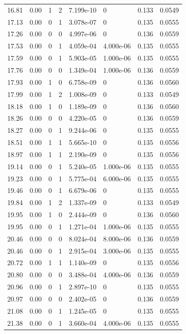 \documentclass[preview]{standalone}
\begin{document}
{{{\begin{tabular}{L{1.2cm}C{1.2cm} C{0.3cm}C{0.5cm} C{1.4cm}C{1.4cm} C{1.4cm}C{1.4cm}}
  16.81  &  0.00  & 1     &  2 &  7.199e-10  & 0  & 0.133 &  0.0549   \\ 
  17.13  &  0.00  & 0     &  1 &  3.078e-07  & 0  & 0.135 &  0.0555   \\ 
  17.26  &  0.00  & 0     &  0 &  4.997e-06  & 0  & 0.136 &  0.0559   \\ 
  17.53  &  0.00  & 0     &  1 &  4.059e-04  & 4.000e-06  & 0.135 &  0.0555   \\ 
  17.59  &  0.00  & 0     &  1 &  5.903e-05  & 1.000e-06  & 0.135 &  0.0555   \\ 
  17.76  &  0.00  & 0     &  0 &  1.349e-04  & 1.000e-06  & 0.136 &  0.0559   \\ 
  17.93  &  0.00  & 1     &  0 &  6.758e-09  & 0  & 0.136 &  0.0560   \\ 
  17.99  &  0.00  & 1     &  2 &  1.008e-09  & 0  & 0.133 &  0.0549   \\ 
  18.18  &  0.00  & 1     &  0 &  1.189e-09  & 0  & 0.136 &  0.0560   \\ 
  18.26  &  0.00  & 0     &  0 &  4.220e-05  & 0  & 0.136 &  0.0559   \\ 
  18.27  &  0.00  & 0     &  1 &  9.244e-06  & 0  & 0.135 &  0.0555   \\ 
  18.51  &  0.00  & 1     &  1 &  5.665e-10  & 0  & 0.135 &  0.0556   \\ 
  18.97  &  0.00  & 1     &  1 &  2.190e-09  & 0  & 0.135 &  0.0556   \\ 
  19.14  &  0.00  & 0     &  1 &  5.240e-05  & 1.000e-06  & 0.135 &  0.0555   \\ 
  19.23  &  0.00  & 0     &  1 &  5.775e-04  & 6.000e-06  & 0.135 &  0.0555   \\ 
  19.46  &  0.00  & 0     &  1 &  6.679e-06  & 0  & 0.135 &  0.0555   \\ 
  19.84  &  0.00  & 1     &  2 &  1.337e-09  & 0  & 0.133 &  0.0549   \\ 
  19.95  &  0.00  & 1     &  0 &  2.444e-09  & 0  & 0.136 &  0.0560   \\ 
  19.95  &  0.00  & 0     &  1 &  1.271e-04  & 1.000e-06  & 0.135 &  0.0555   \\ 
  20.46  &  0.00  & 0     &  0 &  8.024e-04  & 8.000e-06  & 0.136 &  0.0559   \\ 
  20.46  &  0.00  & 0     &  1 &  2.915e-04  & 3.000e-06  & 0.135 &  0.0555   \\ 
  20.72  &  0.00  & 1     &  1 &  1.140e-09  & 0  & 0.135 &  0.0556   \\ 
  20.80  &  0.00  & 0     &  0 &  3.488e-04  & 4.000e-06  & 0.136 &  0.0559   \\ 
  20.96  &  0.00  & 0     &  1 &  2.897e-10  & 0  & 0.135 &  0.0555   \\ 
  20.97  &  0.00  & 0     &  0 &  2.402e-05  & 0  & 0.136 &  0.0559   \\ 
  21.08  &  0.00  & 0     &  1 &  1.245e-05  & 0  & 0.135 &  0.0555   \\ 
  21.38  &  0.00  & 0     &  1 &  3.660e-04  & 4.000e-06  & 0.135 &  0.0555   \\ 
\hline 
\end{tabular} 

}}}
\end{document}
